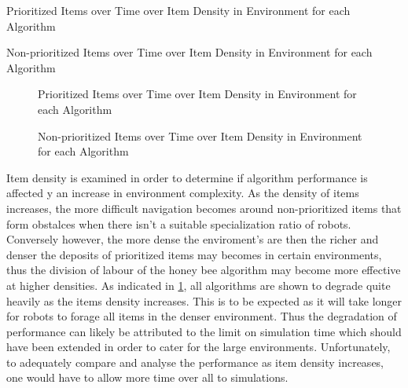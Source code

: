 \begin{table} [h]
     \caption{Prioritized Items over Time over Item Density in Environment for each Algorithm}
     \label{itemdensityprioritized}
	\centering
	\footnotesize
	
\end{table}

\begin{table} [h]
     \caption{Non-prioritized Items over Time over Item Density in Environment for each Algorithm}
     \label{itemdensitynonprioritized}
	\centering
	\footnotesize
	
\end{table}


\begin{figure}[!htb]
\centering
\resizebox{\textwidth}{!}{}
\caption{Prioritized Items over Time over Item Density in Environment  for each Algorithm}
\label{objectgoldplot}
\end{figure}


\begin{figure}[!htb]
\centering
\resizebox{\textwidth}{!}{}
\caption{Non-prioritized Items over Time over Item Density in Environment for each Algorithm}
\label{objectwasteplot}
\end{figure}

Item density is examined in order to determine if algorithm performance is affected y an increase in environment complexity. As the density of items increases, the more difficult navigation becomes around non-prioritized items that form obstalces when there isn't a suitable specialization ratio of robots. Conversely however, the more dense the enviroment's are then the richer and denser the deposits of prioritized items may becomes in certain environments, thus the division of labour of the honey bee algorithm may become more effective at higher densities. As indicated in \ref{objectgoldplot}, all algorithms are shown to degrade quite heavily as the items density increases. This is to be expected as it will take longer for robots to forage all items in the denser environment. Thus the degradation of performance can likely be attributed to the limit on simulation time which should have been extended in order to cater for the large environments. Unfortunately, to adequately compare and analyse the performance as item density increases, one would have to allow more time over all to simulations.

